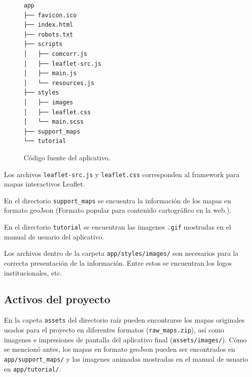 \documentclass[11pt,letterpaper]{article}
\begin{document}
\begin{figure}[ht!]
\centering
\begin{BVerbatim}
app
├── favicon.ico
├── index.html
├── robots.txt
├── scripts
│   ├── comcorr.js
│   ├── leaflet-src.js
│   ├── main.js
│   └── resources.js
├── styles
│   ├── images
│   ├── leaflet.css
│   └── main.scss
├── support_maps
└── tutorial
\end{BVerbatim}
\caption{Código fuente del aplicativo.}\label{fig:app}
\end{figure}

Los archivos {\tt leaflet-src.js} y {\tt leaflet.css} corresponden al framework para mapas interactivos Leaflet.

En el directorio {\tt support\_maps} se encuentra la información de los mapas en formato geoJson (Formato popular para contenido cartográfico en la web.). 

En el directorio {\tt tutorial} se encuentran las imagenes {\tt .gif} mostradas en el manual de usuario del aplicativo.

Los archivos dentro de la carpeta {\tt app/styles/images/} son necesarios para la correcta presentación de la información. Entre estos se encuentran los logos institucionales, etc.

\subsection{Activos del proyecto}

En la capeta {\tt assets} del directorio raíz pueden encontrarse los mapas originales usados para el proyecto en diferentes formatos ({\tt raw\_maps.zip}), así como imagenes e impresiones de pantalla del aplicativo final ({\tt assets/images/}). Cómo se mencionó antes, los mapas en formato geoJson pueden ser encontrados en {\tt app/support\_maps/} y las imagenes animadas mostradas en el manual de usuario en {\tt app/tutorial/}.
\end{document}
